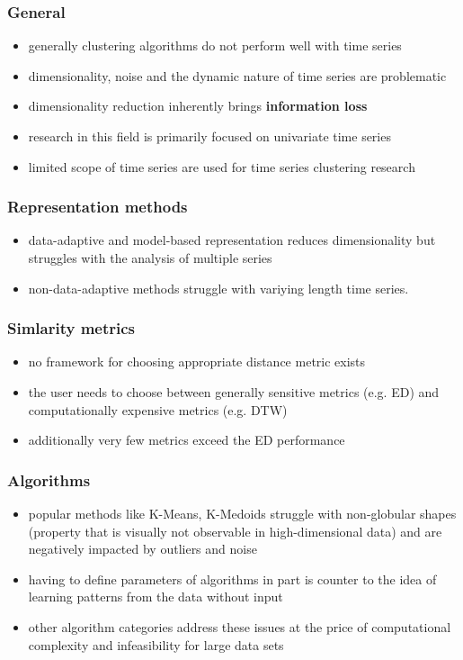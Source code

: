 \documentclass[11pt]{article}
\begin{document}
\subsubsection*{General}
\label{sec:orgc81e167}
\begin{itemize}
\item generally clustering algorithms do not perform well with time series
\item dimensionality, noise and the dynamic nature of time series are problematic
\item dimensionality reduction inherently brings \textbf{information loss}
\item research in this field is primarily focused on univariate time series
\item limited scope of time series are used for time series clustering research
\end{itemize}
\subsubsection*{Representation methods}
\label{sec:org45bc2df}
\begin{itemize}
\item data-adaptive and model-based representation reduces dimensionality but struggles with the analysis of multiple series
\item non-data-adaptive methods struggle with variying length time series.
\end{itemize}
\subsubsection*{Simlarity metrics}
\label{sec:org250c073}
\begin{itemize}
\item no framework for choosing appropriate distance metric exists
\item the user needs to choose between generally sensitive metrics (e.g. ED) and computationally expensive metrics (e.g. DTW)
\item additionally very few metrics exceed the ED performance
\end{itemize}
\subsubsection*{Algorithms}
\label{sec:org1b15ea2}
\begin{itemize}
\item popular methods like K-Means, K-Medoids struggle with non-globular shapes (property that is visually not observable in high-dimensional data) and are negatively impacted by outliers and noise
\item having to define parameters of algorithms in part is counter to the idea of learning patterns from the data without input
\item other algorithm categories address these issues at the price of computational complexity and infeasibility for large data sets
\end{itemize}
\end{document}
